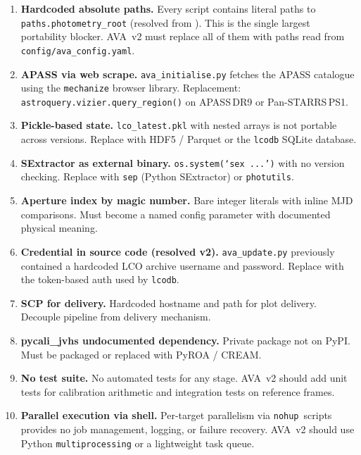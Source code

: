 \documentclass[12pt,a4paper]{article}
\begin{document}
\begin{enumerate}

\item \textbf{Hardcoded absolute paths.}  Every script contains literal paths to
      \texttt{paths.photometry\_root} (resolved from ).  This is the single
      largest portability blocker.  AVA~v2 must replace all of them with paths read from
      \texttt{config/ava\_config.yaml}.

\item \textbf{APASS via web scrape.}  \texttt{ava\_initialise.py} fetches the APASS
      catalogue using the \texttt{mechanize} browser library.  Replacement:
      \texttt{astroquery.vizier.query\_region()} on APASS\,DR9 or Pan-STARRS\,PS1.

\item \textbf{Pickle-based state.}  \texttt{lco\_latest.pkl} with nested arrays is not
      portable across versions.  Replace with HDF5 / Parquet or the \texttt{lcodb}
      SQLite database.

\item \textbf{SExtractor as external binary.}  \texttt{os.system(`sex ...')} with no
      version checking.  Replace with \texttt{sep} (Python SExtractor) or
      \texttt{photutils}.

\item \textbf{Aperture index by magic number.}  Bare integer literals with inline MJD
      comparisons.  Must become a named config parameter with documented physical meaning.

\item \textbf{Credential in source code (resolved v2).}  \texttt{ava\_update.py} previously contained a hardcoded
      LCO archive username and password.  Replace with the token-based auth used by
      \texttt{lcodb}.

\item \textbf{SCP for delivery.}  Hardcoded hostname and path for plot delivery.
      Decouple pipeline from delivery mechanism.

\item \textbf{pycali\_jvhs undocumented dependency.}  Private package not on PyPI.
      Must be packaged or replaced with PyROA / CREAM.

\item \textbf{No test suite.}  No automated tests for any stage.  AVA~v2 should add
      unit tests for calibration arithmetic and integration tests on reference frames.

\item \textbf{Parallel execution via shell.}  Per-target parallelism via
      \texttt{nohup}~scripts provides no job management, logging, or failure recovery.
      AVA~v2 should use Python \texttt{multiprocessing} or a lightweight task queue.

\end{enumerate}
\end{document}
